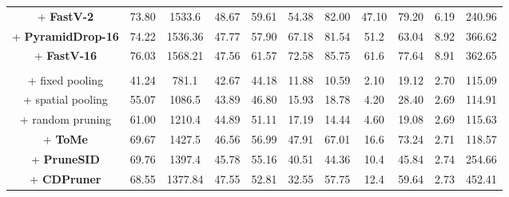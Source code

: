 \documentclass[11pt]{article}
\begin{document}
\begin{table}[ht]
{\begin{tabular}{c|cccc|cccc|cc}
        \hline
        + \textbf{FastV-2} & 73.80 & 1533.6 & 48.67 & 59.61 & 54.38 & 82.00 & 47.10 & 79.20 & 6.19 & 240.96 \\
        + \textbf{PyramidDrop-16} & 74.22 & 1536.36 & 47.77 & 57.90 & 67.18 & 81.54 & 51.2 & 63.04 & 8.92 & 366.62 \\
        + \textbf{FastV-16} & 76.03 & 1568.21 & 47.56 & 61.57 & 72.58 & 85.75 & 61.6 & 77.64 & 8.91 & 362.65 \\

        \rowcolor{green!11}\multicolumn{11}{c}{4x compression} \\
        + fixed pooling & 41.24 & 781.1 & 42.67 & 44.18 & 11.88 & 10.59 & 2.10 & 19.12 & 2.70 & 115.09  \\
        + spatial pooling & 55.07 & 1086.5 & 43.89 & 46.80 & 15.93 & 18.78 & 4.20 & 28.40 & 2.69 & 114.91 \\
        + random pruning & 61.00 & 1210.4 & 44.89 & 51.11 & 17.19 & 14.44 & 4.60 & 19.08 & 2.69 & 115.63 \\
        \hline
        + \textbf{ToMe} & 69.67 & 1427.5 & 46.56 & 56.99 & 47.91 & 67.01 & 16.6 & 73.24 & 2.71 & 118.57 \\
        + \textbf{PruneSID} & 69.76 & 1397.4 & 45.78 & 55.16 & 40.51 & 44.36 & 10.4 & 45.84 & 2.74 & 254.66 \\
        + \textbf{CDPruner} & 68.55 & 1377.84 & 47.55 & 52.81 & 32.55 & 57.75 & 12.4 & 59.64 & 2.73 & 452.41 \\
        

\end{tabular}}
\end{table}
\end{document}
